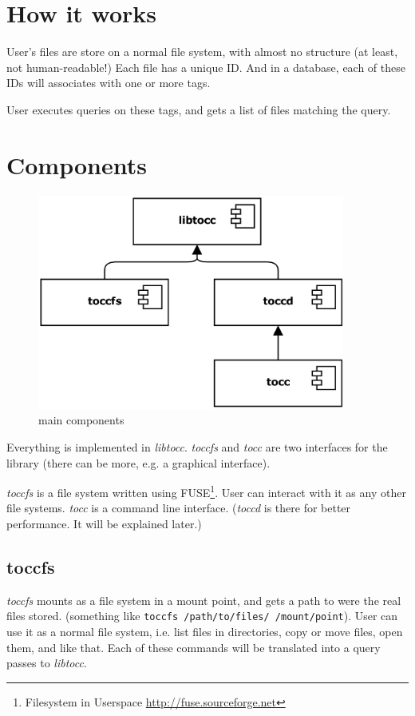 
\section{How it works}
User's files are store on a normal file system, with almost no structure (at least, not human-readable!) Each file has a unique ID. And in a database, each of these IDs will associates with one or more tags.

User executes queries on these tags, and gets a list of files matching the query.

\section{Components}

\begin{figure}
\includegraphics[width=0.9\textwidth]{images/main_components.png}
\caption{main components}
\label{fig:components}
\end{figure}

Everything is implemented in \emph{libtocc}. \emph{toccfs} and \emph{tocc} are two interfaces for the library (there can be more, e.g. a graphical interface).

\emph{toccfs} is a file system written using FUSE\footnote{Filesystem in Userspace \url{http://fuse.sourceforge.net}}. User can interact with it as any other file systems. \emph{tocc} is a command line interface. (\emph{toccd} is there for better performance. It will be explained later.)


\subsection{toccfs}
\emph{toccfs} mounts as a file system in a mount point, and gets a path to were the real files stored. (something like \texttt{toccfs /path/to/files/ /mount/point}). User can use it as a normal file system, i.e. list files in directories, copy or move files, open them, and like that. Each of these commands will be translated into a query passes to \emph{libtocc}.

